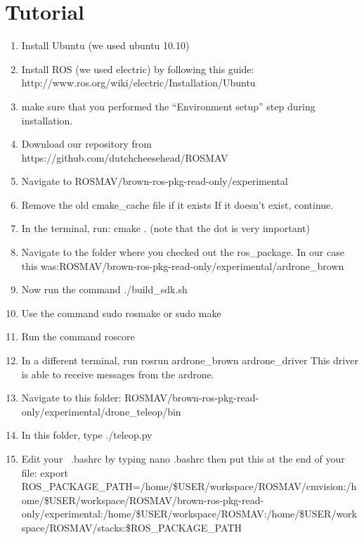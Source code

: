 \documentclass[a4paper,10pt]{article}
\begin{document}
\section{Tutorial}
\begin{enumerate}
\item Install Ubuntu (we used ubuntu 10.10)

\item Install ROS (we used electric) by following this guide: http://www.ros.org/wiki/electric/Installation/Ubuntu

\item make sure that you performed the “Environment setup” step during installation.

\item Download our repository from
https://github.com/dutchcheesehead/ROSMAV

\item Navigate to ROSMAV/brown-ros-pkg-read-only/experimental

\item Remove the old cmake\_cache file if it exists
If it doesn't exist, continue.

\item In the terminal, run: cmake . (note that the dot is very important)

\item Navigate to the folder where you checked out the ros\_package. In our case this was:ROSMAV/brown-ros-pkg-read-only/experimental/ardrone\_brown

\item Now run the command ./build\_sdk.sh

\item Use the command sudo rosmake or sudo make

\item Run the command roscore

\item In a different terminal, run rosrun ardrone\_brown ardrone\_driver This driver is able to receive messages from the ardrone.

\item Navigate to this folder:
ROSMAV/brown-ros-pkg-read-only/experimental/drone\_teleop/bin

\item In this folder, type ./teleop.py

\item Edit your ~.bashrc by typing nano .bashrc then put this at the end of your file: export ROS\_PACKAGE\_PATH=/home/\$USER/workspace/ROSMAV/cmvision:/home/\$USER/workspace/ROSMAV/brown-ros-pkg-read-only/experimental:/home/\$USER/workspace/ROSMAV:/home/\$USER/workspace/ROSMAV/stacks:\$ROS\_PACKAGE\_PATH


\end{enumerate}
\end{document}
